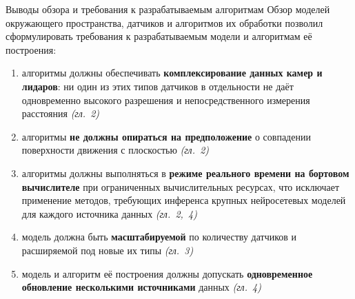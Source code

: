 \begin{frame}{Выводы обзора и требования к разрабатываемым алгоритмам}
	\footnotesize
	Обзор моделей окружающего пространства, датчиков и алгоритмов их обработки позволил сформулировать требования к разрабатываемым модели и алгоритмам её построения:

	\begin{enumerate}
		\item алгоритмы должны обеспечивать \textbf{комплексирование данных камер и лидаров}: ни один из этих типов датчиков в отдельности не даёт одновременно высокого разрешения и непосредственного измерения расстояния \hfill\textit{(гл.~2)}
		\item алгоритмы \textbf{не должны опираться на предположение} о совпадении поверхности движения с плоскостью \hfill\textit{(гл.~2)}
		\item алгоритмы должны выполняться в \textbf{режиме реального времени на бортовом вычислителе} при ограниченных вычислительных ресурсах, что исключает применение методов, требующих инференса крупных нейросетевых моделей для каждого источника данных \hfill\textit{(гл.~2,~4)}
		\item модель должна быть \textbf{масштабируемой} по количеству датчиков и расширяемой под новые их типы \hfill\textit{(гл.~3)}
		\item модель и алгоритм её построения должны допускать \textbf{одновременное обновление несколькими источниками} данных \hfill\textit{(гл.~4)}
	\end{enumerate}
\end{frame}




